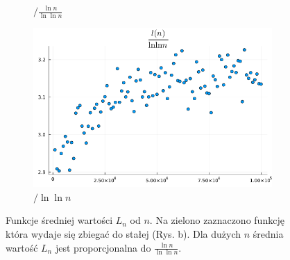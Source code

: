 \documentclass{article}
\begin{document}
\begin{figure}[h]
\begin{subfigure}{0.32\textwidth}
        \caption{$/\frac{\ln n}{\ln \ln n}$}
    \end{subfigure}
    \begin{subfigure}{0.32\textwidth}
        \centering
        \includegraphics[width=1.0\textwidth]{../results/l(n)_3.png}
        \caption{$/ \ln\ln n$}
    \end{subfigure}
    \caption{Funkcje średniej wartości $L_n$ od $n$. Na zielono zaznaczono funkcję która wydaje się zbiegać do stałej (Rys. b). Dla dużych $n$ średnia wartość $L_n$ jest proporcjonalna do $\frac{\ln n}{\ln \ln n}$.}
\end{figure}
\end{document}
